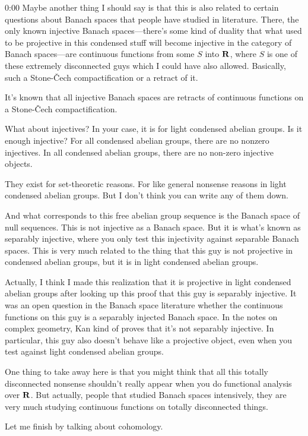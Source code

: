 \begin{unfinished}{0:00}
Maybe another thing I should say is that this is also related to certain questions about Banach spaces that people have studied in literature. There, the only known injective Banach spaces—there's some kind of duality that what used to be projective in this condensed stuff will become injective in the category of Banach spaces—are continuous functions from some $S$ into $\mathbf R$, where $S$ is one of these extremely disconnected guys which I could have also allowed. Basically, such a Stone-Čech compactification or a retract of it.

It's known that all injective Banach spaces are retracts of continuous functions on a Stone-Čech compactification.

What about injectives? In your case, it is for light condensed abelian groups. Is it enough injective? For all condensed abelian groups, there are no nonzero injectives. In all condensed abelian groups, there are no non-zero injective objects.

They exist for set-theoretic reasons. For like general nonsense reasons in light condensed abelian groups. But I don't think you can write any of them down.

And what corresponds to this free abelian group sequence is the Banach space of null sequences. This is not injective as a Banach space. But it is what's known as separably injective, where you only test this injectivity against separable Banach spaces. This is very much related to the thing that this guy is not projective in condensed abelian groups, but it is in light condensed abelian groups.

Actually, I think I made this realization that it is projective in light condensed abelian groups after looking up this proof that this guy is separably injective. It was an open question in the Banach space literature whether the continuous functions on this guy is a separably injected Banach space. In the notes on complex geometry, Kan kind of proves that it's not separably injective. 
In particular, this guy also doesn't behave like a projective object, even when you test against light condensed abelian groups.

One thing to take away here is that you might think that all this totally disconnected nonsense shouldn't really appear when you do functional analysis over $\mathbf R$. But actually, people that studied Banach spaces intensively, they are very much studying continuous functions on totally disconnected things.

Let me finish by talking about cohomology. 


\end{unfinished}
